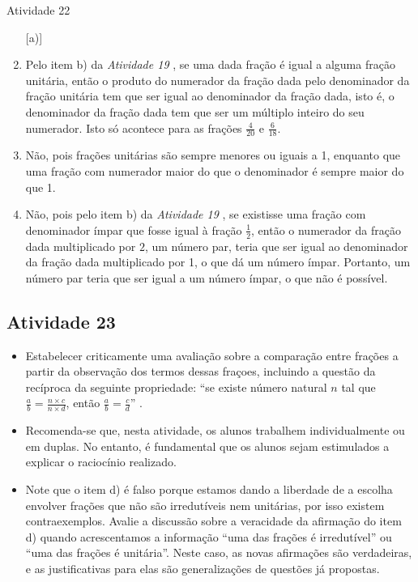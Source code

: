 \begin{multicols}{2}
\begin{resposta*}{Atividade 22}
\begin{enumerate} [\quad a)] %
    \item       Pelo item b) da \emph{Atividade 19}      , se uma dada fração é 
igual a alguma fração unitária, então o produto do numerador da fração dada pelo 
denominador da fração unitária tem que ser igual ao denominador da fração dada, 
isto é, o denominador da fração dada tem que ser um múltiplo inteiro do seu 
numerador. Isto só acontece para as frações       $\frac{4}{20}$       e       
$\frac{6}{18}$.
    \item       Não, pois frações unitárias são sempre menores ou iguais a 1, 
enquanto que uma fração com numerador maior do que o denominador é sempre maior 
do que 1.
    \item       Não, pois pelo item b) da \emph{Atividade 19}      , se 
existisse uma fração com denominador ímpar que fosse igual à fração       
$\frac{1}{2}$, então o numerador da fração dada multiplicado por       $2$, um 
número par, teria que ser igual ao denominador da fração dada multiplicado por 
1, o que dá um número ímpar. Portanto, um número par teria que ser igual a um 
número ímpar, o que não é possível. 
\end{enumerate} %
  
\end{resposta*}


\subsection{Atividade 23}

\begin{itemize} %
  \item     Estabelecer criticamente uma avaliação sobre a comparação entre 
frações a partir da observação dos termos dessas fraçoes, incluindo a questão da 
recíproca da seguinte propriedade:     ``se existe número natural $n$ tal que 
$\frac{a}{b} = \frac{n \times c}{n \times d}$, então $\frac{a}{b} = 
\frac{c}{d}$''    . 
\end{itemize} %


\begin{itemize} %
  \item     Recomenda-se que, nesta atividade, os alunos trabalhem 
individualmente ou em duplas. No entanto, é fundamental que os alunos sejam 
estimulados a explicar o raciocínio realizado.
  \item     Note que o item d) é falso porque estamos dando a liberdade de a 
escolha envolver frações que não são irredutíveis nem unitárias, por isso 
existem contraexemplos. Avalie a discussão sobre a veracidade da afirmação do 
item d) quando acrescentamos a informação ``uma das frações é irredutível'' ou 
``uma das frações é unitária''. Neste caso, as novas afirmações são verdadeiras, 
e as justificativas para elas são generalizações de questões já propostas.
\end{itemize} %


\end{multicols}

